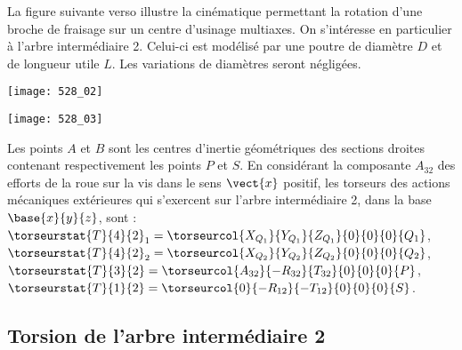\normaltrue
\correctionfalse


\setcounter{question}{0}

\ifcorrection
\else
{}
\fi

\ifprof
\else

La figure suivante verso illustre la cinématique permettant la rotation d'une broche de fraisage sur un centre d'usinage multiaxes.
On s'intéresse en particulier à l'arbre intermédiaire 2. Celui-ci est modélisé  par une poutre de diamètre $D$ et de longueur utile $L$. Les variations de diamètres seront négligées.

\begin{center}
\texttt{[image: 528\_02]}
\end{center}


\begin{center}
\texttt{[image: 528\_03]}
\end{center}


Les points $A$ et $B$ sont les centres d’inertie géométriques des sections droites contenant
respectivement les points $P$ et $S$.
En considérant la composante $A_{32}$ des efforts de la roue sur la vis dans le sens $\vect{x}$ positif, les
torseurs des actions mécaniques extérieures qui s’exercent sur l’arbre intermédiaire 2, dans la base
$\base{x}{y}{z}$, sont :
$\torseurstat{T}{4}{2}_1 = \torseurcol{X_{Q_1}}{Y_{Q_1}}{Z_{Q_1}}{0}{0}{0}{Q_1}$, 
$\torseurstat{T}{4}{2}_2 = \torseurcol{X_{Q_2}}{Y_{Q_2}}{Z_{Q_2}}{0}{0}{0}{Q_2}$, 
$\torseurstat{T}{3}{2} = \torseurcol{A_{32}}{-R_{32}}{T_{32}}{0}{0}{0}{P}$, 
$\torseurstat{T}{1}{2} = \torseurcol{0}{-R_{12}}{-T_{12}}{0}{0}{0}{S}$.

\fi




\subsection*{Torsion de l’arbre intermédiaire 2}

